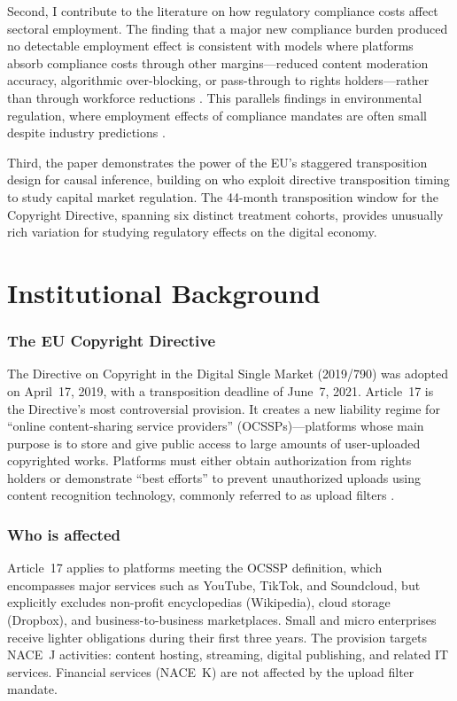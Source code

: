 \documentclass[12pt]{article}
\begin{document}
Second, I contribute to the literature on how regulatory compliance costs affect sectoral employment. The finding that a major new compliance burden produced no detectable employment effect is consistent with models where platforms absorb compliance costs through other margins---reduced content moderation accuracy, algorithmic over-blocking, or pass-through to rights holders---rather than through workforce reductions \citep{urban2017notice}. This parallels findings in environmental regulation, where employment effects of compliance mandates are often small despite industry predictions \citep{greenstone2012environmental, walker2013transitional}.

Third, the paper demonstrates the power of the EU's staggered transposition design for causal inference, building on \citet{christensen2016effect} who exploit directive transposition timing to study capital market regulation. The 44-month transposition window for the Copyright Directive, spanning six distinct treatment cohorts, provides unusually rich variation for studying regulatory effects on the digital economy.

\section{Institutional Background}

\subsubsection*{The EU Copyright Directive}  The Directive on Copyright in the Digital Single Market (2019/790) was adopted on April~17, 2019, with a transposition deadline of June~7, 2021. Article~17 is the Directive's most controversial provision. It creates a new liability regime for ``online content-sharing service providers'' (OCSSPs)---platforms whose main purpose is to store and give public access to large amounts of user-uploaded copyrighted works. Platforms must either obtain authorization from rights holders or demonstrate ``best efforts'' to prevent unauthorized uploads using content recognition technology, commonly referred to as upload filters \citep{senftleben2020copyright}.

\subsubsection*{Who is affected}  Article~17 applies to platforms meeting the OCSSP definition, which encompasses major services such as YouTube, TikTok, and Soundcloud, but explicitly excludes non-profit encyclopedias (Wikipedia), cloud storage (Dropbox), and business-to-business marketplaces. Small and micro enterprises receive lighter obligations during their first three years. The provision targets NACE~J activities: content hosting, streaming, digital publishing, and related IT services. Financial services (NACE~K) are not affected by the upload filter mandate.
\end{document}
